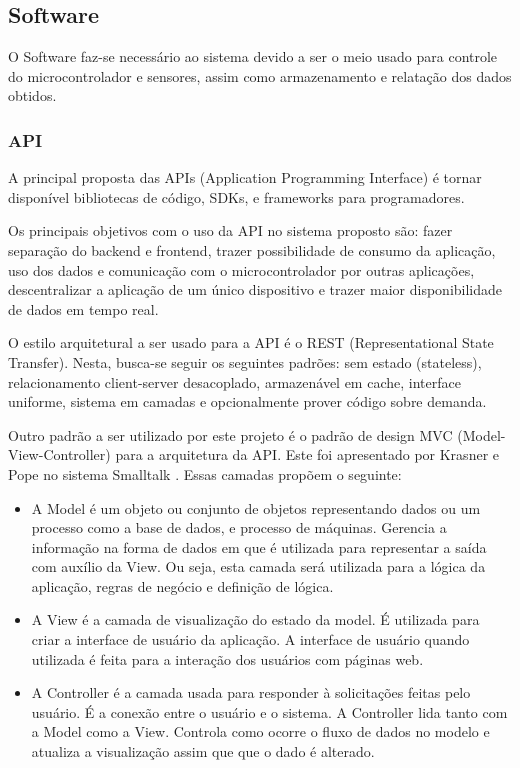 \documentclass[conference]{IEEEtran}
\begin{document}
\subsection{Software}
O Software faz-se necessário ao sistema devido a ser o meio usado para controle do microcontrolador e sensores, assim como armazenamento e relatação dos dados obtidos.

\subsubsection{API}
A principal proposta das APIs (Application Programming Interface) é tornar disponível bibliotecas de código, SDKs, e frameworks para programadores. \cite{b12, b13}

Os principais objetivos com o uso da API no sistema proposto são: fazer separação do backend e frontend, trazer possibilidade de consumo da aplicação, uso dos dados e comunicação com o microcontrolador por outras aplicações, descentralizar a aplicação de um único dispositivo e trazer maior disponibilidade de dados em tempo real.

O estilo arquitetural a ser usado para a API é o REST (Representational State Transfer). Nesta, busca-se seguir os seguintes padrões: sem estado (stateless), relacionamento client-server desacoplado, armazenável em cache, interface uniforme, sistema em camadas e opcionalmente prover código sobre demanda. \cite{b12, b13}

Outro padrão a ser utilizado por este projeto é o padrão de design MVC (Model-View-Controller) para a arquitetura da API. Este foi apresentado por Krasner e Pope no sistema Smalltalk \cite{b16}. Essas camadas propõem o seguinte: 
\begin{itemize}
    \item A Model é um objeto ou conjunto de objetos representando dados ou um processo como a base de dados, e processo de máquinas. Gerencia a informação na forma de dados em que é utilizada para representar a saída com auxílio da View. Ou seja, esta camada será utilizada para a lógica da aplicação, regras de negócio e definição de lógica. \cite{b14, b15}
    \item A View é a camada de visualização do estado da model. É utilizada para criar a interface de usuário da aplicação. A interface de usuário quando utilizada é feita para a interação dos usuários com páginas web. \cite{b14, b15}
    \item A Controller é a camada usada para responder à solicitações feitas pelo usuário. É a conexão entre o usuário e o sistema. A Controller lida tanto com a Model como a View. Controla como ocorre o fluxo de dados no modelo e atualiza a visualização assim que que o dado é alterado. \cite{b14, b15}
\end{itemize} 
\end{document}
